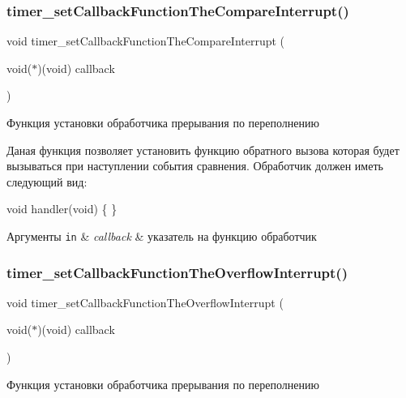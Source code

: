 \subsubsection{\texorpdfstring{timer\+\_\+set\+Callback\+Function\+The\+Compare\+Interrupt()}{timer\_setCallbackFunctionTheCompareInterrupt()}}
{\footnotesize\ttfamily void timer\+\_\+set\+Callback\+Function\+The\+Compare\+Interrupt (\begin{DoxyParamCaption}\item[{void($\ast$)(void)}]{callback }\end{DoxyParamCaption})}



Функция установки обработчика прерывания по переполнению 

Даная функция позволяет установить функцию обратного вызова которая будет вызываться при наступлении события сравнения. Обработчик должен иметь следующий вид\+: 
\begin{DoxyCode}
\textcolor{keywordtype}{void} handler(\textcolor{keywordtype}{void})
\{ 
\}
\end{DoxyCode}
 
\begin{DoxyParams}[1]{Аргументы}
\mbox{\tt in}  & {\em callback} & указатель на функцию обработчик \\
\hline
\end{DoxyParams}
\mbox{\label{group__timer_counter_ga67dcad411b9845d922ced4c709b2698f}} 
\subsubsection{\texorpdfstring{timer\+\_\+set\+Callback\+Function\+The\+Overflow\+Interrupt()}{timer\_setCallbackFunctionTheOverflowInterrupt()}}
{\footnotesize\ttfamily void timer\+\_\+set\+Callback\+Function\+The\+Overflow\+Interrupt (\begin{DoxyParamCaption}\item[{void($\ast$)(void)}]{callback }\end{DoxyParamCaption})}



Функция установки обработчика прерывания по переполнению 

